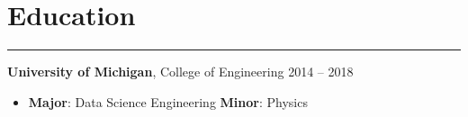 \documentclass[11pt]{article}
\newcommand{\resumesection}[1]{\vspace{-0.5cm}\section*{\LARGE#1}\vspace{-0.2cm}\hrule\vspace{0.2cm}}
\begin{document}





\resumesection{Education}

\textbf{University of Michigan}, College of Engineering \hfill 2014 -- 2018

\begin{itemize}
  \item \textbf{Major}: Data Science Engineering \textbf{Minor}: Physics
\end{itemize}
\end{document}
